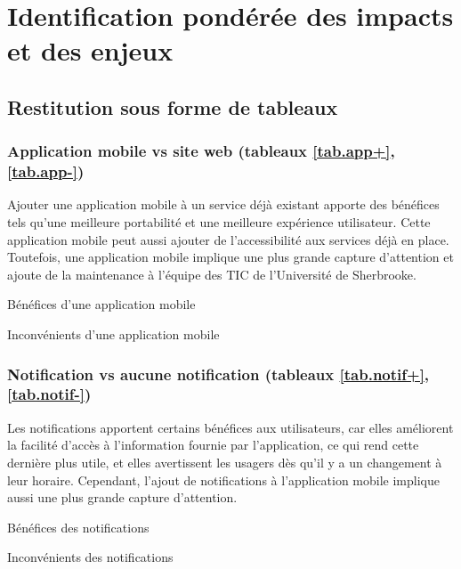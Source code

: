 \renewcommand{\arraystretch}{2}

\section{Identification pondérée des impacts et des enjeux}
	\subsection{Restitution sous forme de tableaux}
		\subsubsection[Application mobile vs site web]{Application mobile vs site web (tableaux \ref{tab.app+}, \ref{tab.app-})}
		Ajouter une application mobile à un service déjà existant apporte des bénéfices tels qu'une meilleure portabilité et une meilleure expérience utilisateur. Cette application mobile peut aussi ajouter de l'accessibilité aux services déjà en place. Toutefois, une application mobile implique une plus grande capture d'attention et ajoute de la maintenance à l'équipe des TIC de l'Université de Sherbrooke. 
	
		\begin{sidewaystable}[p]
			\centering
			\caption{Bénéfices d'une application mobile}
			\label{tab.app+}
			
		\bigskip\bigskip
			\centering
			\caption{Inconvénients d'une application mobile}
			\label{tab.app-}
			
		\end{sidewaystable}
		
		\subsubsection[Notification vs aucune notification]{Notification vs aucune notification (tableaux \ref{tab.notif+}, \ref{tab.notif-})}
		Les notifications apportent certains bénéfices aux utilisateurs, car elles améliorent la facilité d'accès à l'information fournie par l'application, ce qui rend cette dernière plus utile, et elles avertissent les usagers dès qu'il y a un changement à leur horaire. Cependant, l'ajout de notifications à l'application mobile implique aussi une plus grande capture d'attention.
	
		\begin{sidewaystable}[p]
			\centering
			\caption{Bénéfices des notifications}
			\label{tab.notif+}
			
		\bigskip\bigskip
			\centering
			\caption{Inconvénients des notifications}
			\label{tab.notif-}
			
		\end{sidewaystable}
		
